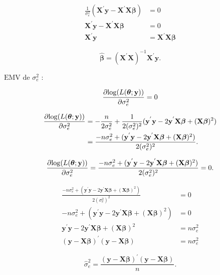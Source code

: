 \documentclass[12pt, oldfontcommands]{article}\usepackage[]{graphicx}\usepackage[]{color}
\begin{document}
\begin{align*}
 \frac{1}{\sigma_{e}^{2}}
 (\mathbf{X}^{'}\mathbf{y} - \mathbf{X}^{'}\mathbf{X}\bm{\beta}) & = 0 
 \\ \mathbf{X}^{'}\mathbf{y} - \mathbf{X}^{'}\mathbf{X}\bm{\beta} & = 0
 \\ \mathbf{X}^{'}\mathbf{y} & = \mathbf{X}^{'}\mathbf{X}\bm{\beta}
\end{align*}

\[\boxed{\hat{\bm{\beta}} =
         (\mathbf{X}^{'}\mathbf{X})^{-1}\mathbf{X}^{'}\mathbf{y}.} \]

\(\boxed{\text{EMV de } \sigma_{e}^{2}}\) :

\[ \frac{\partial
   {\rm log}(L(\bm{\theta}; \mathbf{y}))}{\partial \sigma_{e}^{2}} = 0
\]

\begin{align*}
 \frac{\partial
 {\rm log}(L(\bm{\theta}; \mathbf{y}))}{\partial \sigma_{e}^{2}} & =
 -\frac{n}{2\sigma_{e}^{2}} + \frac{1}{2(\sigma_{e}^{2})^{2}}
 (\mathbf{y}^{'}\mathbf{y} - 2\mathbf{y}^{'}\mathbf{X}\bm{\beta} +
 (\mathbf{X}\bm{\beta})^{2}) \\ & = \frac{-n\sigma_{e}^{2} +
 (\mathbf{y}^{'}\mathbf{y} - 2\mathbf{y}^{'}\mathbf{X}\bm{\beta} +
 (\mathbf{X}\bm{\beta})^{2})}{2(\sigma_{e}^{2})^{2}}.
\end{align*}

\[ \frac{\partial
   {\rm log}(L(\bm{\theta}; \mathbf{y}))}{\partial \sigma_{e}^{2}} =
   \frac{-n\sigma_{e}^{2} + (\mathbf{y}^{'}\mathbf{y} -
   2\mathbf{y}^{'}\mathbf{X}\bm{\beta} +
   (\mathbf{X}\bm{\beta})^{2})}{2(\sigma_{e}^{2})^{2}} = 0. \]

\begin{align*}
 \frac{-n\sigma_{e}^{2} + (\mathbf{y}^{'}\mathbf{y} -
 2\mathbf{y}^{'}\mathbf{X}\bm{\beta} +
 (\mathbf{X}\bm{\beta})^{2})}{2(\sigma_{e}^{2})^{2}} & = 0 \\
 -n\sigma_{e}^{2} + (\mathbf{y}^{'}\mathbf{y} -
 2\mathbf{y}^{'}\mathbf{X}\bm{\beta} + (\mathbf{X}\bm{\beta})^{2}) & = 0
 \\ \mathbf{y}^{'}\mathbf{y} - 2\mathbf{y}^{'}\mathbf{X}\bm{\beta} +
 (\mathbf{X}\bm{\beta})^{2} & = n\sigma_{e}^{2} \\
 (\mathbf{y} - \mathbf{X} \bm{\beta})^{'}
 (\mathbf{y} - \mathbf{X} \bm{\beta}) & = n\sigma_{e}^{2}
\end{align*}

\[\boxed{\hat{\sigma}_{e}^{2} = \frac{
         (\mathbf{y} - \mathbf{X} \bm{\beta})^{'}
         (\mathbf{y} - \mathbf{X} \bm{\beta})}{n}.} \]
\end{document}
